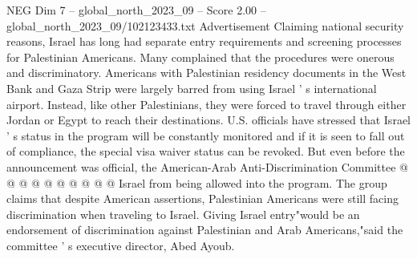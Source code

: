 \begin{textsample}{NEG Dim 7 – global\_north\_2023\_09 – Score 2.00 – global\_north\_2023\_09/102123433.txt}
Advertisement Claiming national security reasons, Israel has long had separate entry requirements and screening processes for Palestinian Americans.
Many complained that the procedures were onerous and discriminatory.
Americans with Palestinian residency documents in the West Bank and Gaza Strip were largely barred from using Israel ' s international airport.
Instead, like other Palestinians, they were forced to travel through either Jordan or Egypt to reach their destinations.
U.S. officials have stressed that Israel ' s status in the program will be constantly monitored and if it is seen to fall out of compliance, the special visa waiver status can be revoked.
But even before the announcement was official, the American-Arab Anti-Discrimination Committee @ @ @ @ @ @ @ @ @ @ Israel from being allowed into the program.
The group claims that despite American assertions, Palestinian Americans were still facing discrimination when traveling to Israel.
Giving Israel entry"would be an endorsement of discrimination against Palestinian and Arab Americans,"said the committee ' s executive director, Abed Ayoub.

\end{textsample}

